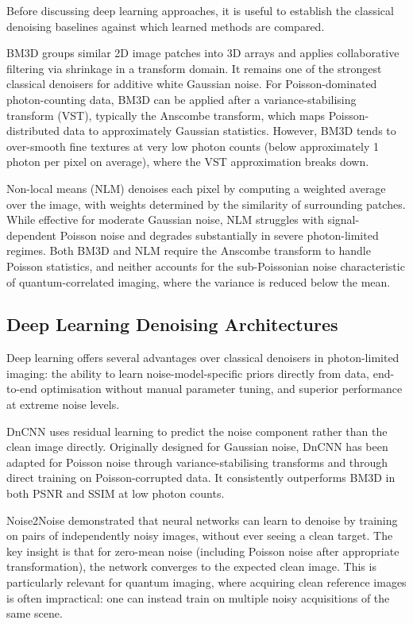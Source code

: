 Before discussing deep learning approaches, it is useful to establish the classical denoising baselines against which learned methods are compared.

BM3D \citep{dabov2007} groups similar 2D image patches into 3D arrays and applies collaborative filtering via shrinkage in a transform domain. It remains one of the strongest classical denoisers for additive white Gaussian noise. For Poisson-dominated photon-counting data, BM3D can be applied after a variance-stabilising transform (VST), typically the Anscombe transform, which maps Poisson-distributed data to approximately Gaussian statistics. However, BM3D tends to over-smooth fine textures at very low photon counts (below approximately 1 photon per pixel on average), where the VST approximation breaks down.

Non-local means (NLM) \citep{buades2005} denoises each pixel by computing a weighted average over the image, with weights determined by the similarity of surrounding patches. While effective for moderate Gaussian noise, NLM struggles with signal-dependent Poisson noise and degrades substantially in severe photon-limited regimes. Both BM3D and NLM require the Anscombe transform to handle Poisson statistics, and neither accounts for the sub-Poissonian noise characteristic of quantum-correlated imaging, where the variance is reduced below the mean.

\subsection{Deep Learning Denoising Architectures}

Deep learning offers several advantages over classical denoisers in photon-limited imaging: the ability to learn noise-model-specific priors directly from data, end-to-end optimisation without manual parameter tuning, and superior performance at extreme noise levels.

DnCNN \citep{zhang2017dncnn} uses residual learning to predict the noise component rather than the clean image directly. Originally designed for Gaussian noise, DnCNN has been adapted for Poisson noise through variance-stabilising transforms and through direct training on Poisson-corrupted data. It consistently outperforms BM3D in both PSNR and SSIM at low photon counts.

Noise2Noise \citep{lehtinen2018} demonstrated that neural networks can learn to denoise by training on pairs of independently noisy images, without ever seeing a clean target. The key insight is that for zero-mean noise (including Poisson noise after appropriate transformation), the network converges to the expected clean image. This is particularly relevant for quantum imaging, where acquiring clean reference images is often impractical: one can instead train on multiple noisy acquisitions of the same scene.

